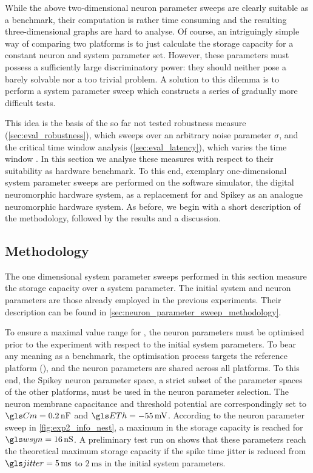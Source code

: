 While the above two-dimensional neuron parameter sweeps are clearly suitable as a benchmark, their computation is rather time consuming and the resulting three-dimensional graphs are hard to analyse. Of course, an intriguingly simple way of comparing two platforms is to just calculate the storage capacity for a constant neuron and system parameter set. However, these parameters must possess a sufficiently large discriminatory power: they should neither pose a barely solvable nor a too trivial problem. A solution to this dilemma is to perform a system parameter sweep which constructs a series of gradually more difficult tests.

This idea is the basis of the so far not tested robustness measure (\cref{sec:eval_robustness}), which sweeps over an arbitrary noise parameter $\sigma$, and the critical time window analysis (\cref{sec:eval_latency}), which varies the  time window \timeWindow. In this section we analyse these measures with respect to their suitability as hardware benchmark. To this end, exemplary one-dimensional system parameter sweeps are performed on the \NEST software simulator, the \NMMC digital neuromorphic hardware system, \ESS as a replacement for \NMPM and Spikey as an analogue neuromorphic hardware system. As before, we begin with a short description of the methodology, followed by the results and a discussion.

\subsection{Methodology}
\label{sec:initial_parameters}

The one dimensional system parameter sweeps performed in this section measure the storage capacity \info over a system parameter. The initial system and neuron parameters are those already employed in the previous experiments. Their description can be found in \cref{sec:neuron_parameter_sweep_methodology}.

To ensure a maximal value range for \info, the neuron parameters \nParams must be optimised prior to the experiment with respect to the initial system parameters. To bear any meaning as a benchmark, the optimisation process targets the reference platform (\NEST), and the neuron parameters \nParams are shared across all platforms. To this end, the Spikey neuron parameter space, a strict subset of the parameter spaces of the other platforms, must be used in the neuron parameter selection. The \LIF neuron membrane capacitance and threshold potential are correspondingly set to $\Cm = \SI{0.2}{\nano\farad}$ and $\ETh = \SI{-55}{\milli\volt}$. According to the neuron parameter sweep in \cref{fig:exp2_info_nest}, a maximum in the storage capacity is reached for $\wsyn = \SI{16}{\nano\siemens}$. A preliminary test run on \NEST shows that these parameters reach the theoretical maximum storage capacity if the spike time jitter is reduced from $\jitter = \SI{5}{\milli\second}$ to $\SI{2}{\milli\second}$ in the initial system parameters.

